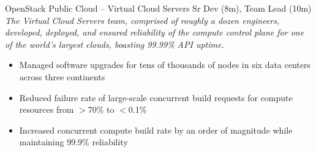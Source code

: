 \documentclass[margin,line]{resume}
\begin{document}
\begin{resume}
\begin{itemize}
\end{itemize}\vspace{-\baselineskip} %
\vspace{4pt}
{\small OpenStack Public Cloud -- Virtual Cloud Servers  \hfill  Sr Dev (8m), Team Lead (10m)}\\
{\small\textit{The Virtual Cloud Servers team, comprised of roughly a dozen engineers, developed, deployed, and
ensured reliability of the compute control plane for one of the world's largest clouds, boasting 99.99\% API uptime.}}
\begin{itemize} \itemsep -2pt %
\small\item Managed software upgrades for tens of thousands of nodes in six data centers across three continents
\small\item Reduced failure rate of large-scale concurrent build requests for compute resources from $>$70\% to $<$0.1\%
\small\item Increased concurrent compute build rate by an order of magnitude while maintaining 99.9\% reliability
\end{itemize}
\vspace{4pt}


\end{resume}
\end{document}
